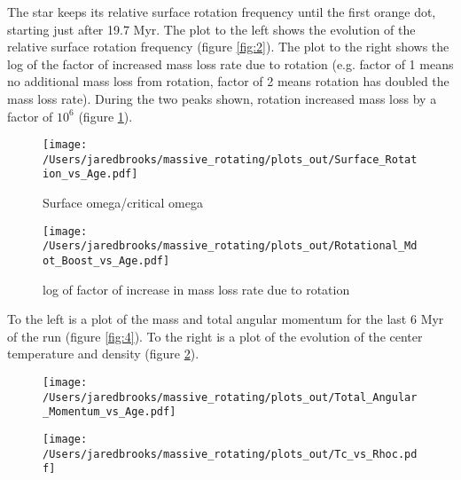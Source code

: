 \documentclass{article}
\begin{document}
        \pagebreak

        The star keeps its relative surface rotation frequency until the first orange dot, starting just after 19.7 Myr.  The plot to the left shows the evolution of the relative surface rotation frequency (figure \ref{fig:2}).  The plot to the right shows the log of the factor of increased mass loss rate due to rotation (e.g. factor of 1 means no additional mass loss from rotation, factor of 2 means rotation has doubled the mass loss rate).  During the two peaks shown, rotation increased mass loss by a factor of $10^6$ (figure \ref{fig:3}).

        \begin{figure}[H]
          \begin{minipage}[b]{0.5\linewidth}
	    \centering
	    \texttt{[image: /Users/jaredbrooks/massive\_rotating/plots\_out/Surface\_Rotation\_vs\_Age.pdf]}
	    \caption{Surface omega/critical omega}
	    \label{fig:2}
          \end{minipage}
          \hspace{0cm}
          \begin{minipage}[b]{0.5\linewidth}
            \centering
            \texttt{[image: /Users/jaredbrooks/massive\_rotating/plots\_out/Rotational\_Mdot\_Boost\_vs\_Age.pdf]}
            \caption{log of factor of increase in mass loss rate due to rotation}
            \label{fig:3}
          \end{minipage}
	\end{figure}

        To the left is a plot of the mass and total angular momentum for the last 6 Myr of the run (figure \ref{fig:4}).  To the right is a plot of the evolution of the center temperature and density (figure \ref{fig:5}).

        \begin{figure}[H]
            \begin{minipage}[b]{0.5\linewidth}
            \centering
            \texttt{[image: /Users/jaredbrooks/massive\_rotating/plots\_out/Total\_Angular\_Momentum\_vs\_Age.pdf]}
            \caption{}
            \label{fig:4}
          \end{minipage}
          \hspace{0cm}
          \begin{minipage}[b]{0.5\linewidth}
            \centering
            \texttt{[image: /Users/jaredbrooks/massive\_rotating/plots\_out/Tc\_vs\_Rhoc.pdf]}
            \caption{}
            \label{fig:5}
          \end{minipage}
        \end{figure}
\end{document}
